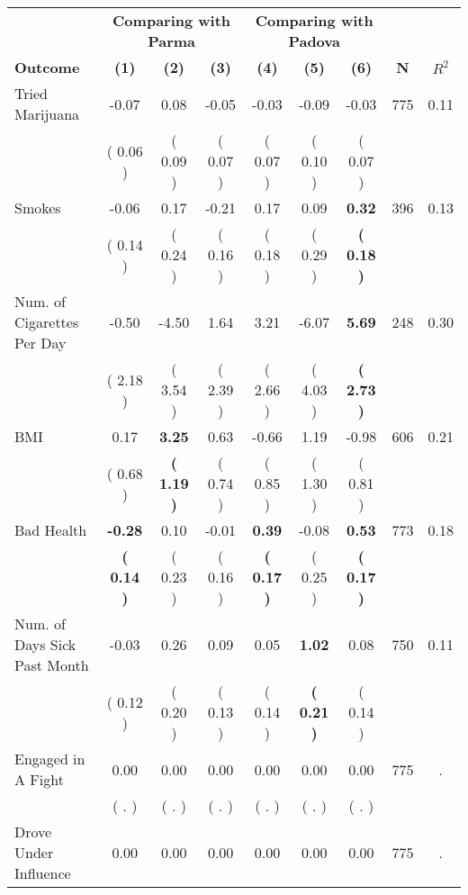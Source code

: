 \begin{tabular}{lcccccccc}
\toprule
 & \multicolumn{3}{c}{\textbf{Comparing with Parma}} & \multicolumn{3}{c}{\textbf{Comparing with Padova}} & \\
\cmidrule(lr){2-4} \cmidrule(lr){5-7} 
 \textbf{Outcome} & \textbf{(1)} & \textbf{(2)} & \textbf{(3)} & \textbf{(4)} & \textbf{(5)} & \textbf{(6)} & \textbf{N} & \textbf{$ R^2$} \\
\midrule
Tried Marijuana &     -0.07 &      0.08 &     -0.05 &     -0.03 &     -0.09 &     -0.03 & 775 &       0.11 \\ 
 & (     0.06 ) & (     0.09 ) & (     0.07 ) & (     0.07 ) & (     0.10 ) & (     0.07 ) & \\
Smokes &     -0.06 &      0.17 &     -0.21 &      0.17 &      0.09 & \textbf{     0.32} & 396 &       0.13 \\ 
 & (     0.14 ) & (     0.24 ) & (     0.16 ) & (     0.18 ) & (     0.29 ) & \textbf{(     0.18 )} & \\
Num. of Cigarettes Per Day &     -0.50 &     -4.50 &      1.64 &      3.21 &     -6.07 & \textbf{     5.69} & 248 &       0.30 \\ 
 & (     2.18 ) & (     3.54 ) & (     2.39 ) & (     2.66 ) & (     4.03 ) & \textbf{(     2.73 )} & \\
BMI &      0.17 & \textbf{     3.25} &      0.63 &     -0.66 &      1.19 &     -0.98 & 606 &       0.21 \\ 
 & (     0.68 ) & \textbf{(     1.19 )} & (     0.74 ) & (     0.85 ) & (     1.30 ) & (     0.81 ) & \\
Bad Health & \textbf{    -0.28} &      0.10 &     -0.01 & \textbf{     0.39} &     -0.08 & \textbf{     0.53} & 773 &       0.18 \\ 
 & \textbf{(     0.14 )} & (     0.23 ) & (     0.16 ) & \textbf{(     0.17 )} & (     0.25 ) & \textbf{(     0.17 )} & \\
Num. of Days Sick Past Month &     -0.03 &      0.26 &      0.09 &      0.05 & \textbf{     1.02} &      0.08 & 750 &       0.11 \\ 
 & (     0.12 ) & (     0.20 ) & (     0.13 ) & (     0.14 ) & \textbf{(     0.21 )} & (     0.14 ) & \\
Engaged in A Fight &      0.00 &      0.00 &      0.00 &      0.00 &      0.00 &      0.00 & 775 &          . \\ 
 & (        . ) & (        . ) & (        . ) & (        . ) & (        . ) & (        . ) & \\
Drove Under Influence &      0.00 &      0.00 &      0.00 &      0.00 &      0.00 &      0.00 & 775 &          . \\ 

\end{tabular}
